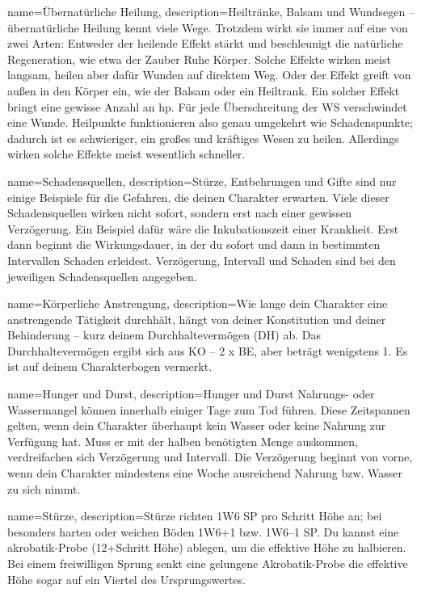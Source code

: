 {
    name={Übernatürliche Heilung},
    description={Heiltränke, Balsam und Wundsegen – übernatürliche Heilung kennt viele Wege. Trotzdem wirkt sie immer auf eine von zwei Arten: Entweder der heilende Effekt stärkt und beschleunigt die natürliche Regeneration, wie etwa der Zauber Ruhe Körper. Solche Effekte wirken meist langsam, heilen aber dafür Wunden auf direktem Weg. Oder der Effekt greift von außen in den Körper ein, wie der Balsam oder ein Heiltrank. Ein solcher Effekt bringt eine gewisse Anzahl an \gls{hp}. Für jede Überschreitung der WS verschwindet eine Wunde. Heilpunkte funktionieren also genau umgekehrt wie Schadenspunkte; dadurch ist es schwieriger, ein großes und kräftiges Wesen zu heilen. Allerdings wirken solche Effekte meist wesentlich schneller.}}

{
    name={Schadensquellen},
    description={Stürze, Entbehrungen und Gifte sind nur einige Beispiele für die Gefahren, die deinen Charakter erwarten. Viele dieser Schadensquellen wirken nicht sofort, sondern erst nach einer gewissen Verzögerung. Ein Beispiel dafür wäre die Inkubationszeit einer Krankheit. Erst dann beginnt die Wirkungsdauer, in der du sofort und dann in bestimmten Intervallen Schaden erleidest. Verzögerung, Intervall und Schaden sind bei den jeweiligen Schadensquellen angegeben.}}

{
    name={Körperliche Anstrengung},
    description={Wie lange dein Charakter eine anstrengende Tätigkeit durchhält, hängt von deiner Konstitution und deiner Behinderung – kurz deinem Durchhaltevermögen (DH) ab. Das Durchhaltevermögen ergibt sich aus KO – 2 x BE, aber beträgt wenigstens 1. Es ist auf deinem Charakterbogen vermerkt.}}

{
    name={Hunger und Durst},
    description={Hunger und Durst Nahrungs- oder Wassermangel können innerhalb einiger Tage zum Tod führen. Diese Zeitspannen gelten, wenn dein Charakter überhaupt kein Wasser oder keine Nahrung zur Verfügung hat. Muss er mit der halben benötigten Menge auskommen, verdreifachen sich Verzögerung und Intervall. Die Verzögerung beginnt von vorne, wenn dein Charakter mindestens eine Woche ausreichend Nahrung bzw. Wasser zu sich nimmt.}}

{
    name={Stürze},
    description={Stürze richten 1W6 SP pro Schritt Höhe an; bei besonders harten oder weichen Böden 1W6+1 bzw. 1W6–1 SP. Du kannst eine \gls{akrobatik}-Probe (12+Schritt Höhe) ablegen, um die effektive Höhe zu halbieren. Bei einem freiwilligen Sprung senkt eine gelungene Akrobatik-Probe die effektive Höhe sogar auf ein Viertel des Ursprungswertes.}}

